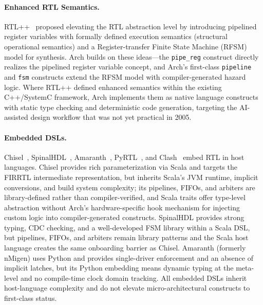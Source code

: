 \documentclass[manuscript]{acmart}
\begin{document}
\paragraph{Enhanced RTL Semantics.}
RTL++~\cite{rtlpp} proposed elevating the RTL abstraction level by introducing pipelined register variables with formally defined execution semantics (structural operational semantics) and a Register-transfer Finite State Machine (RFSM) model for synthesis. Arch builds on these ideas---the \texttt{pipe\_reg} construct directly realizes the pipelined register variable concept, and Arch's first-class \texttt{pipeline} and \texttt{fsm} constructs extend the RFSM model with compiler-generated hazard logic. Where RTL++ defined enhanced semantics within the existing C++/SystemC framework, Arch implements them as native language constructs with static type checking and deterministic code generation, targeting the AI-assisted design workflow that was not yet practical in 2005.

\paragraph{Embedded DSLs.}
Chisel~\cite{chisel}, SpinalHDL~\cite{spinalhdl}, Amaranth~\cite{amaranth}, PyRTL~\cite{pyrtl}, and Clash~\cite{clash} embed RTL in host languages. Chisel provides rich parameterization via Scala and targets the FIRRTL intermediate representation, but inherits Scala's JVM runtime, implicit conversions, and build system complexity; its pipelines, FIFOs, and arbiters are library-defined rather than compiler-verified, and Scala traits offer type-level abstraction without Arch's hardware-specific hook mechanism for injecting custom logic into compiler-generated constructs. SpinalHDL provides strong typing, CDC checking, and a well-developed FSM library within a Scala DSL, but pipelines, FIFOs, and arbiters remain library patterns and the Scala host language creates the same onboarding barrier as Chisel. Amaranth (formerly nMigen) uses Python and provides single-driver enforcement and an absence of implicit latches, but its Python embedding means dynamic typing at the meta-level and no compile-time clock domain tracking. All embedded DSLs inherit host-language complexity and do not elevate micro-architectural constructs to first-class status.
\end{document}
